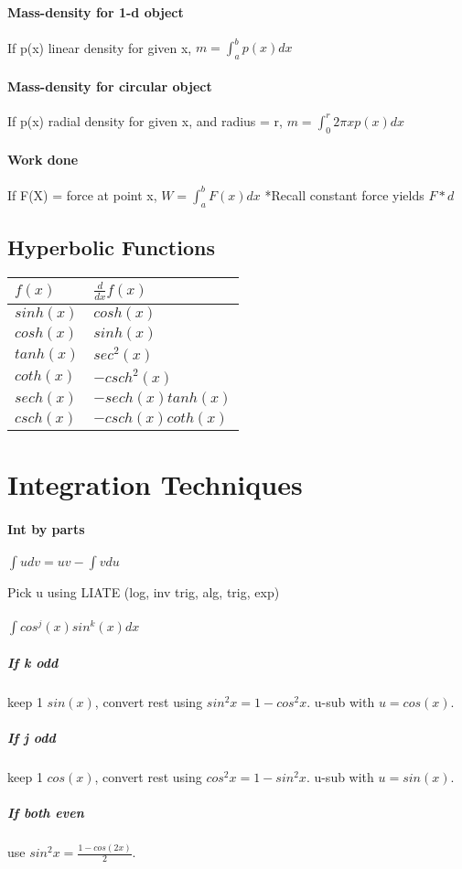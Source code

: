 \documentclass[10pt,landscape]{article}
\begin{document}
\begin{multicols}{4}
\paragraph{Mass-density for 1-d object}
If p(x) linear density for given x,
$m = \int_{a}^{b}p(x)dx$

\paragraph{Mass-density for circular object}
If p(x) radial density for given x, and radius = r,
$m = \int_{0}^{r}2 \pi x p(x)dx$

\paragraph{Work done}
If F(X) = force at point x,
$W = \int_{a}^{b} F(x) dx$
*Recall constant force yields $F*d$

\subsection{Hyperbolic Functions}

\begin{tabular}{l l}
$f(x)$ & $\frac{d}{dx}f(x)$ \\
\hline
$sinh(x)$ & $cosh(x)$ \\
$cosh(x)$ & $sinh(x)$ \\
$tanh(x)$ & $sec^2(x)$ \\
$coth(x)$ & $-csch^2(x)$ \\
$sech(x)$ & $-sech(x)tanh(x)$ \\
$csch(x)$ & $-csch(x)coth(x)$ \\
\hline
\end{tabular}

\section{Integration Techniques}

\paragraph{Int by parts} 
$\int u dv = uv - \int v du$

Pick u using LIATE (log, inv trig, alg, trig, exp)

\hrulefill

\paragraph{$ \int cos^j(x)sin^k(x)dx $}
\subparagraph{If k odd}
keep 1 $sin(x)$, convert rest using $sin^2x = 1-cos^2x$. u-sub with $u=cos(x)$.
\subparagraph{If j odd}
keep 1 $cos(x)$, convert rest using $cos^2x = 1-sin^2x$. u-sub with $u=sin(x)$.
\subparagraph{If both even}
use $sin^2x=\frac{1-cos(2x)}{2}$.


\end{multicols}
\end{document}

